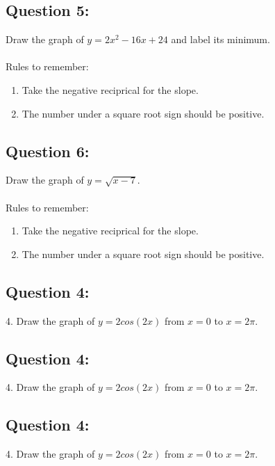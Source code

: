 \documentclass[12pt, letterpaper]{article}
\begin{document}
\subsection{Question 5:}
  Draw the graph of $y=2x^2-16x+24$ and label its minimum.
  \\\\
  Rules to remember:
  \begin{enumerate}
    \item Take the negative reciprical for the slope.
    \item The number under a square root sign should be positive.
  \end{enumerate}

\subsection{Question 6:}
  Draw the graph of $y=\sqrt{x-7}$.
  \\\\
  Rules to remember:
  \begin{enumerate}
    \item Take the negative reciprical for the slope.
    \item The number under a square root sign should be positive.
  \end{enumerate}

\subsection{Question 4:}
4. Draw the graph of $y=2cos(2x)$ from $x=0$ to $x=2\pi$.

\subsection{Question 4:}
4. Draw the graph of $y=2cos(2x)$ from $x=0$ to $x=2\pi$.

\subsection{Question 4:}
4. Draw the graph of $y=2cos(2x)$ from $x=0$ to $x=2\pi$.
\end{document}
